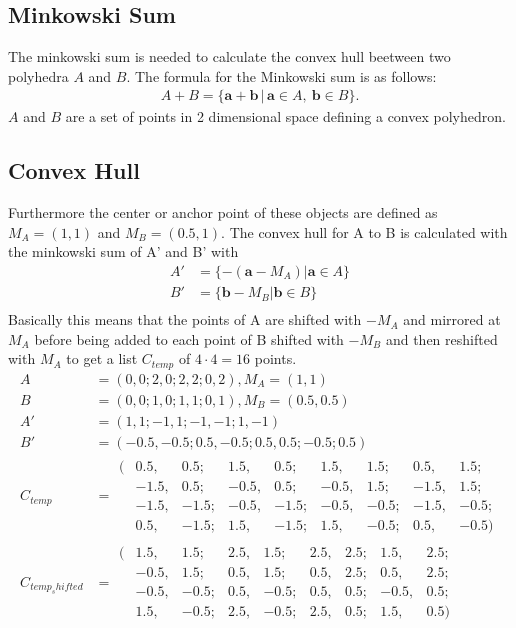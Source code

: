 \subsection{Minkowski Sum}
The minkowski sum is needed to calculate the convex hull beetween two polyhedra $A$ and $B$. The formula for the Minkowski sum is as follows:
\begin{align*}
 A + B = \{\mathbf{a}+\mathbf{b}\,|\,\mathbf{a}\in A,\ \mathbf{b}\in B\}. 
\end{align*}
$A$ and $B$ are a set of points in 2 dimensional space defining a convex polyhedron. 

\subsection{Convex Hull} %
Furthermore the center or anchor point of these objects are defined as $M_A = (1,1)$ and $M_B = (0.5 , 1)$.
The convex hull for A to B is calculated with the minkowski sum of A' and B' with
\begin{align*}
A'  &= \{ -(\mathbf{a} - M_A) |\mathbf{a} \in A \}\\
B'  &= \{ \mathbf{b} - M_B |\mathbf{b} \in B \}\\
\end{align*}
Basically this means that the points of A are shifted with $-M_A$ and mirrored at $M_A$ before being added to each point of B shifted with $-M_B$ and then reshifted with $M_A$ to get a list $C_{temp}$ of $4\cdot 4 = 16$  points.
\begin{align*}
A &= 	( 0 , 0; 2 , 0; 2, 2; 0, 2), M_A =( 1, 1)\\
B &= (0, 0; 1, 0; 1, 1; 0, 1),  M_B =(0.5, 0.5)\\
A' &= (1, 1; -1, 1; -1, -1; 1, -1)\\
B' &= (-0.5, -0.5; 0.5, -0.5; 0.5, 0.5; -0.5; 0.5)\\
C_{temp} &=	\begin{matrix}
		(&0.5, &0.5; &1.5, &0.5; &1.5, &1.5; &0.5, &1.5;\\
		&-1.5, &0.5; &-0.5, &0.5; &-0.5, &1.5; &-1.5, &1.5;\\
		&-1.5, &-1.5; &-0.5, &-1.5; &-0.5, &-0.5; &-1.5, &-0.5;\\
		&0.5, &-1.5; &1.5, &-1.5; &1.5, &-0.5; &0.5, &-0.5)
		\end{matrix}\\
C_{temp_shifted} &= \begin{matrix}
		(&1.5, &1.5; &2.5, &1.5; &2.5, &2.5; &1.5, &2.5;\\
		&-0.5, &1.5; &0.5, &1.5; &0.5, &2.5; &0.5, &2.5;\\
		&-0.5, &-0.5; &0.5, &-0.5; &0.5, &0.5; &-0.5, &0.5;\\
		&1.5, &-0.5; &2.5, &-0.5; &2.5, &0.5; &1.5, &0.5)
		\end{matrix}\\
\end{align*}
